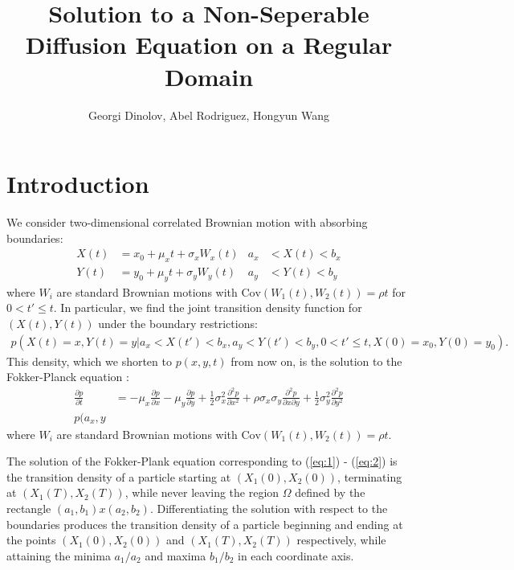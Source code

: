 \documentclass[10pt]{article}
\title{Solution to a Non-Seperable Diffusion Equation on a Regular Domain}
\author{Georgi Dinolov, Abel Rodriguez, Hongyun Wang}
\date{} %
\begin{document}
\def\spacingset#1{\renewcommand{\baselinestretch}%
{#1}\small\normalsize} \spacingset{1}

\bigskip

\vspace{1cm}
\noindent

\spacingset{1.00} %
\section{Introduction}

We consider two-dimensional correlated Brownian motion with absorbing boundaries:
\begin{align}
  X(t) &= x_0 + \mu_x t + \sigma_x W_x(t) &a_x &< X(t) < b_x   \label{eq:X} \\
  Y(t) &= y_0 + \mu_y t + \sigma_y W_y(t) &a_y &< Y(t) < b_y   \label{eq:Y} 
\end{align}
where $W_i$ are standard Brownian motions with
$\mbox{Cov}(W_1(t), W_2(t)) = \rho t$ for $0 < t' \leq t$. In
particular, we find the joint transition density function for
$(X(t), Y(t))$ under the boundary restrictions:
\begin{align*}
  p\left(X(t) = x, Y(t) = y | a_x < X(t') < b_x, a_y < Y(t') < b_y, 0 < t' \leq t, X(0)=x_0, Y(0)=y_0 \right).
\end{align*}
This density, which we shorten to $p(x,y,t)$ from now
on, is the solution to the Fokker-Planck equation \citep{oksendal2003stochastic}:
\begin{align}
  \frac{\partial p}{\partial t} &= -\mu_x \frac{\partial p}{\partial x} - \mu_y \frac{\partial p}{\partial y} + \frac{1}{2}\sigma_x^2 \frac{\partial^2 p}{\partial x^2} + \rho\sigma_x\sigma_y \frac{\partial^2 p}{\partial x \partial y}+ \frac{1}{2}\sigma_y^2 \frac{\partial^2 p}{\partial y^2}
  \label{eq:1} \\
  p(a_x, y  \label{eq:2}
\end{align}
where $W_i$ are standard Brownian motions with
$\mbox{Cov}(W_1(t), W_2(t)) = \rho t$.

The solution of the Fokker-Plank equation corresponding to
(\ref{eq:1}) - (\ref{eq:2}) is the transition density of a particle
starting at $(X_1(0), X_2(0))$, terminating at $(X_1(T), X_2(T))$,
while never leaving the region $\Omega$ defined by the rectangle
$(a_1, b_1) x (a_2,b_2)$. Differentiating the solution with respect to the
boundaries produces the transition density of a particle
beginning and ending at the points $(X_1(0), X_2(0))$ and
$(X_1(T), X_2(T))$ respectively, while attaining the minima $a_1/a_2$
and maxima $b_1/b_2$ in each coordinate axis.
\end{document}
